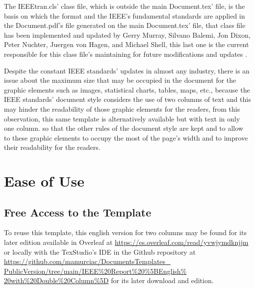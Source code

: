 \documentclass[letterpaper, 10pt, conference]{IEEEtran} %
\begin{document}
	The IEEEtran.cls' class file, which is outside the main Document.tex' file, is the basis on which the format and the IEEE's fundamental standards are applied in the Document.pdf's file generated on the main Document.tex' file, that class file has been implemented and updated by Gerry Murray, Silvano Balemi, Jon Dixon, Peter Nuchter, Juergen von Hagen, and Michael Shell, this last one is the current responsible for this class file's maintaining for future modifications and updates \cite{bibliographicReference2}.
	
	Despite the constant IEEE standards' updates in almost any industry, there is an issue about the maximum size that may be occupied in the document for the graphic elements such as images, statistical charts, tables, maps, etc., because the IEEE standards' document style considers the use of two columns of text and this may hinder the readability of those graphic elements for the readers, from this observation, this same template is alternatively available but with text in only one column. so that the other rules of the document style are kept and to allow to these graphic elements to occupy the most of the page's width and to improve their readability for the readers.
	
	\section{Ease of Use} \label{sectionEaseOfUse}
	\subsection{Free Access to the Template} \label{subsectionFreeAccessToTheTemplate}
	To reuse this template, this english version for two columns may be found for its later edition available in Overleaf at \href{https://es.overleaf.com/read/yvwjymdknjjm}{https://es.overleaf.com/read/yvwjymdknjjm} or locally with the TexStudio's IDE in the Github repository at \href{https://github.com/mamurciac/DocumentsTemplates_PublicVersion/tree/main/IEEE%20Report%20%5BEnglish%20with%20Double%20Column%5D}{https://github.com/mamurciac/DocumentsTemplates\_ PublicVersion/tree/main/IEEE\%20Report\%20\%5BEnglish\% 20with\%20Double\%20Column\%5D} for its later download and edition.
	
\end{document}
